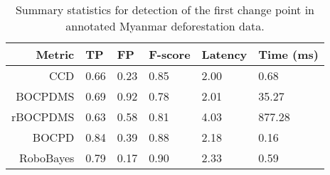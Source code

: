 \begin{table}[H]
\centering
\caption{Summary statistics for detection of the first change point in annotated Myanmar deforestation data.} 
\label{tab:myanmar_results}
\begin{tabular}{rlllll}
  \hline
 Metric & TP & FP & F-score & Latency & Time (ms) \\ 
   \hline
CCD & 0.66 & 0.23 & 0.85 & 2.00 & 0.68 \\ 
  BOCPDMS & 0.69 & 0.92 & 0.78 & 2.01 & 35.27 \\ 
  rBOCPDMS & 0.63 & 0.58 & 0.81 & 4.03 & 877.28 \\ 
  BOCPD & 0.84 & 0.39 & 0.88 & 2.18 & 0.16 \\ 
  RoboBayes & 0.79 & 0.17 & 0.90 & 2.33 & 0.59 \\ 
  \end{tabular}
\end{table}
